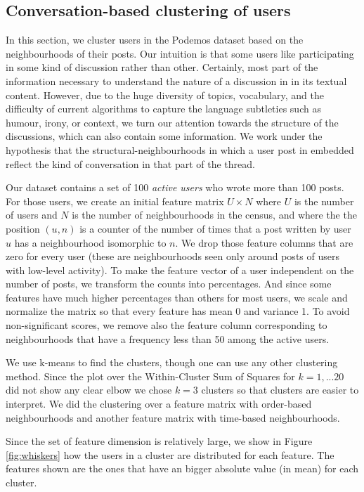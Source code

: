 \documentclass[conference]{IEEEtran}
\begin{document}
\subsection{Conversation-based clustering of users}
In this section, we cluster users in the Podemos dataset based on the neighbourhoods of their posts. Our intuition is that some users like participating in some kind of discussion rather than other. Certainly, most part of the information necessary to understand the nature of a discussion in in its textual content. However, due to the huge diversity of topics, vocabulary, and the difficulty of current algorithms to capture the language subtleties such as humour, irony, or context, we turn our attention towards the structure of the discussions, which can also contain some information. We work under the  hypothesis that the structural-neighbourhoods in which a user post in embedded reflect the kind of conversation in that part of the thread. 

Our dataset contains a set of 100 \textit{active users} who wrote more than 100 posts. For those users, we create an initial feature matrix $U\times N$ where $U$ is the number of users and $N$ is the number of neighbourhoods in the census, and where the the position $(u,n)$ is a counter of the number of times that a post written by user $u$ has a neighbourhood isomorphic to $n$. We drop those feature columns that are zero for every user (these are neighbourhoods seen only around posts of users with low-level activity). To make the feature vector of a user independent on the number of posts, we transform the counts into percentages. And since some features have much higher percentages than others for most users, we scale and normalize the matrix so that every feature has mean 0 and variance 1. To avoid non-significant scores, we remove also the feature column corresponding to neighbourhoods that have a frequency less than 50 among the active users.

We use k-means to find the clusters, though one can use any other clustering method. Since the plot over the Within-Cluster Sum of Squares for $k=1,...20$ did not show any clear elbow we chose $k=3$ clusters so that clusters are easier to interpret. We did the clustering over a feature matrix with order-based neighbourhoods and another feature matrix with time-based neighbourhoods.

Since the set of feature dimension is relatively large, we show in Figure \ref{fig:whiskers} how the users in a cluster are distributed for each feature. The features shown are the ones that have an bigger absolute value (in mean) for each cluster.
\end{document}
